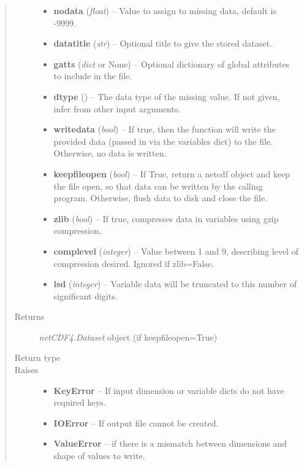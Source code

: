 \documentclass[letterpaper,10pt,english]{sphinxmanual}
\begin{document}
\begin{fulllineitems}
\begin{quote}
\begin{description}
\begin{itemize}
\item {} 
\textbf{nodata} (\emph{float}) -- Value to assign to missing data, default is -9999.

\item {} 
\textbf{datatitle} (\emph{str}) -- Optional title to give the stored dataset.

\item {} 
\textbf{gatts} (\emph{dict} or None) -- Optional dictionary of global attributes to include in the
file.

\item {} 
\textbf{dtype} () -- The data type of the missing value. If not given, infer from
other input arguments.

\item {} 
\textbf{writedata} (\emph{bool}) -- If true, then the function will write the provided
data (passed in via the variables dict) to the file. Otherwise, no data
is written.

\item {} 
\textbf{keepfileopen} (\emph{bool}) -- If True, return a netcdf object and keep the
file open, so that data can be written by the calling program.
Otherwise, flush data to disk and close the file.

\item {} 
\textbf{zlib} (\emph{bool}) -- If true, compresses data in variables using gzip
compression.

\item {} 
\textbf{complevel} (\emph{integer}) -- Value between 1 and 9, describing level of
compression desired. Ignored if zlib=False.

\item {} 
\textbf{lsd} (\emph{integer}) -- Variable data will be truncated to this number of
significant digits.

\end{itemize}

\item[{Returns}] \leavevmode
\emph{netCDF4.Dataset} object (if keepfileopen=True)

\item[{Return type}] \leavevmode
{}

\item[{Raises}] \leavevmode\begin{itemize}
\item {} 
\textbf{KeyError} -- If input dimension or variable dicts do not have required
keys.

\item {} 
\textbf{IOError} -- If output file cannot be created.

\item {} 
\textbf{ValueError} -- if there is a mismatch between dimensions and shape of
values to write.

\end{itemize}

\end{description}\end{quote}

\end{fulllineitems}
\end{document}
